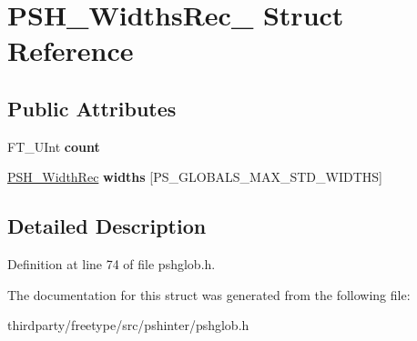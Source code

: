 \hypertarget{struct_p_s_h___widths_rec__}{}\section{P\+S\+H\+\_\+\+Widths\+Rec\+\_\+ Struct Reference}
\label{struct_p_s_h___widths_rec__}
\subsection*{Public Attributes}
\begin{DoxyCompactItemize}
\item 
\mbox{\label{struct_p_s_h___widths_rec___ae3ce08a15ef246455f859245017cda40}} 
F\+T\+\_\+\+U\+Int {\bfseries count}
\item 
\mbox{\label{struct_p_s_h___widths_rec___a52a91ea0edf500d918703dcfaf12aac1}} 
\hyperlink{struct_p_s_h___width_rec__}{P\+S\+H\+\_\+\+Width\+Rec} {\bfseries widths} \mbox{[}P\+S\+\_\+\+G\+L\+O\+B\+A\+L\+S\+\_\+\+M\+A\+X\+\_\+\+S\+T\+D\+\_\+\+W\+I\+D\+T\+HS\mbox{]}
\end{DoxyCompactItemize}


\subsection{Detailed Description}


Definition at line 74 of file pshglob.\+h.



The documentation for this struct was generated from the following file\+:\begin{DoxyCompactItemize}
\item 
thirdparty/freetype/src/pshinter/pshglob.\+h\end{DoxyCompactItemize}
